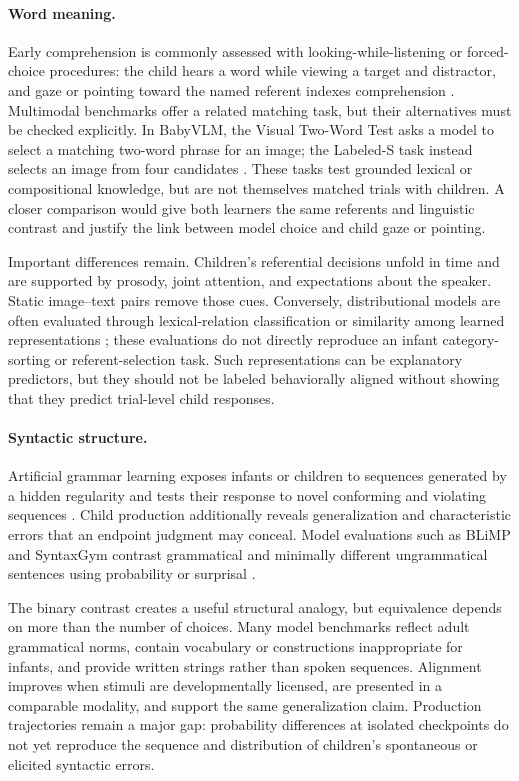 \paragraph{Word meaning.}
Early comprehension is commonly assessed with looking-while-listening or forced-choice procedures: the child hears a word while viewing a target and distractor, and gaze or pointing toward the named referent indexes comprehension \citep{bergelson_at_2012,Lany2011,Bergelson2017,barbir2023rapid}. Multimodal benchmarks offer a related matching task, but their alternatives must be checked explicitly. In BabyVLM, the Visual Two-Word Test asks a model to select a matching two-word phrase for an image; the Labeled-S task instead selects an image from four candidates \citep{Wang2025}. These tasks test grounded lexical or compositional knowledge, but are not themselves matched trials with children. A closer comparison would give both learners the same referents and linguistic contrast and justify the link between model choice and child gaze or pointing.

Important differences remain. Children's referential decisions unfold in time and are supported by prosody, joint attention, and expectations about the speaker. Static image--text pairs remove those cues. Conversely, distributional models are often evaluated through lexical-relation classification or similarity among learned representations \citep{Lenci2022}; these evaluations do not directly reproduce an infant category-sorting or referent-selection task. Such representations can be explanatory predictors, but they should not be labeled behaviorally aligned without showing that they predict trial-level child responses.

\paragraph{Syntactic structure.}
Artificial grammar learning exposes infants or children to sequences generated by a hidden regularity and tests their response to novel conforming and violating sequences \citep{Marcus1999,gervain2012binding}. Child production additionally reveals generalization and characteristic errors that an endpoint judgment may conceal. Model evaluations such as BLiMP and SyntaxGym contrast grammatical and minimally different ungrammatical sentences using probability or surprisal \citep{warstadt2020blimp,Hu2020,marvin2018targeted,salazar_masked_2020}.

The binary contrast creates a useful structural analogy, but equivalence depends on more than the number of choices. Many model benchmarks reflect adult grammatical norms, contain vocabulary or constructions inappropriate for infants, and provide written strings rather than spoken sequences. Alignment improves when stimuli are developmentally licensed, are presented in a comparable modality, and support the same generalization claim. Production trajectories remain a major gap: probability differences at isolated checkpoints do not yet reproduce the sequence and distribution of children's spontaneous or elicited syntactic errors.

